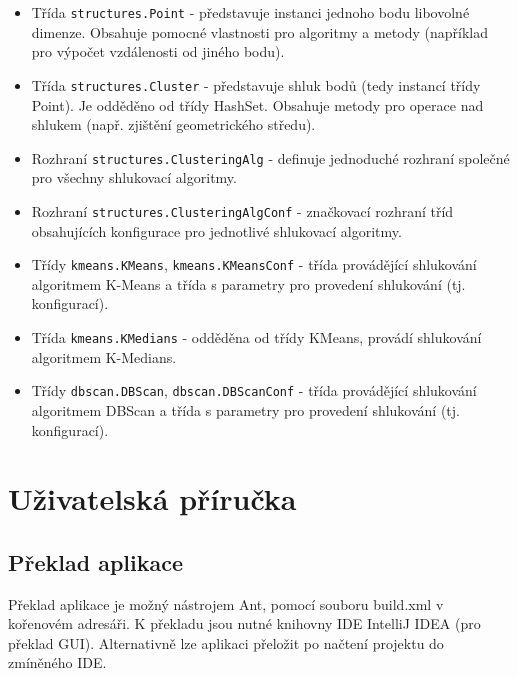 \documentclass[pdftex,a4paper]{article}
\begin{document}
\medskip

\begin{itemize}
	\item Třída \texttt{structures.Point} - představuje instanci jednoho bodu libovolné dimenze. Obsahuje pomocné vlastnosti pro algoritmy a metody (například pro výpočet vzdálenosti od jiného bodu).
	
	\item Třída \texttt{structures.Cluster} - představuje shluk bodů (tedy instancí třídy Point). Je odděděno od třídy HashSet. Obsahuje metody pro operace nad shlukem (např. zjištění geometrického středu).
	
	\item Rozhraní \texttt{structures.ClusteringAlg} - definuje jednoduché rozhraní společné pro všechny shlukovací algoritmy.
	
	\item Rozhraní \texttt{structures.ClusteringAlgConf} - značkovací rozhraní tříd obsahujících konfigurace pro jednotlivé shlukovací algoritmy.
\end{itemize}

\medskip

\begin{itemize}
	\item Třídy \texttt{kmeans.KMeans}, \texttt{kmeans.KMeansConf} - třída provádějící shlukování algoritmem K-Means a třída s parametry pro provedení shlukování (tj. konfigurací).
	
	\item Třída \texttt{kmeans.KMedians} - odděděna od třídy KMeans, provádí shlukování algoritmem K-Medians.
	
	\item Třídy \texttt{dbscan.DBScan}, \texttt{dbscan.DBScanConf} - třída provádějící shlukování algoritmem DBScan a třída s parametry pro provedení shlukování (tj. konfigurací).
\end{itemize}


\newpage

\section{Uživatelská příručka}

\subsection{Překlad aplikace}
Překlad aplikace je možný nástrojem Ant, pomocí souboru build.xml v kořenovém adresáři. K překladu jsou nutné knihovny IDE IntelliJ IDEA (pro překlad GUI). Alternativně lze aplikaci přeložit po načtení projektu do zmíněného IDE.
\end{document}
